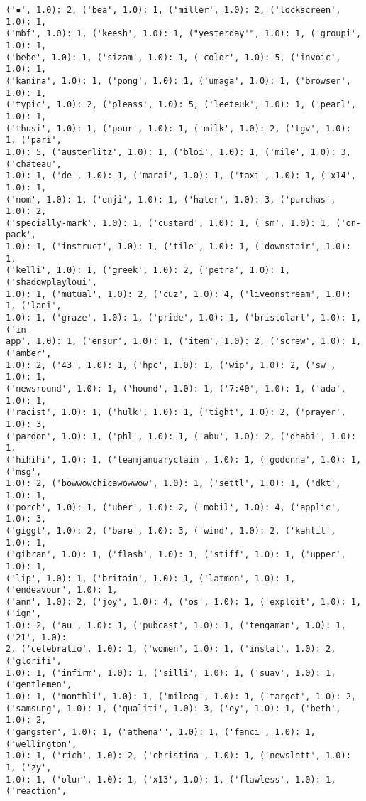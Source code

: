 \documentclass[11pt]{article}
\begin{document}
\begin{Verbatim}[commandchars=\\\{\}]
('▪', 1.0): 2, ('️bea', 1.0): 1, ('miller', 1.0): 2, ('lockscreen', 1.0): 1,
('mbf', 1.0): 1, ('keesh', 1.0): 1, ("yesterday'", 1.0): 1, ('groupi', 1.0): 1,
('bebe', 1.0): 1, ('sizam', 1.0): 1, ('color', 1.0): 5, ('invoic', 1.0): 1,
('kanina', 1.0): 1, ('pong', 1.0): 1, ('umaga', 1.0): 1, ('browser', 1.0): 1,
('typic', 1.0): 2, ('pleass', 1.0): 5, ('leeteuk', 1.0): 1, ('pearl', 1.0): 1,
('thusi', 1.0): 1, ('pour', 1.0): 1, ('milk', 1.0): 2, ('tgv', 1.0): 1, ('pari',
1.0): 5, ('austerlitz', 1.0): 1, ('bloi', 1.0): 1, ('mile', 1.0): 3, ('chateau',
1.0): 1, ('de', 1.0): 1, ('marai', 1.0): 1, ('taxi', 1.0): 1, ('x14', 1.0): 1,
('nom', 1.0): 1, ('enji', 1.0): 1, ('hater', 1.0): 3, ('purchas', 1.0): 2,
('specially-mark', 1.0): 1, ('custard', 1.0): 1, ('sm', 1.0): 1, ('on-pack',
1.0): 1, ('instruct', 1.0): 1, ('tile', 1.0): 1, ('downstair', 1.0): 1,
('kelli', 1.0): 1, ('greek', 1.0): 2, ('petra', 1.0): 1, ('shadowplayloui',
1.0): 1, ('mutual', 1.0): 2, ('cuz', 1.0): 4, ('liveonstream', 1.0): 1, ('lani',
1.0): 1, ('graze', 1.0): 1, ('pride', 1.0): 1, ('bristolart', 1.0): 1, ('in-
app', 1.0): 1, ('ensur', 1.0): 1, ('item', 1.0): 2, ('screw', 1.0): 1, ('amber',
1.0): 2, ('43', 1.0): 1, ('hpc', 1.0): 1, ('wip', 1.0): 2, ('sw', 1.0): 1,
('newsround', 1.0): 1, ('hound', 1.0): 1, ('7:40', 1.0): 1, ('ada', 1.0): 1,
('racist', 1.0): 1, ('hulk', 1.0): 1, ('tight', 1.0): 2, ('prayer', 1.0): 3,
('pardon', 1.0): 1, ('phl', 1.0): 1, ('abu', 1.0): 2, ('dhabi', 1.0): 1,
('hihihi', 1.0): 1, ('teamjanuaryclaim', 1.0): 1, ('godonna', 1.0): 1, ('msg',
1.0): 2, ('bowwowchicawowwow', 1.0): 1, ('settl', 1.0): 1, ('dkt', 1.0): 1,
('porch', 1.0): 1, ('uber', 1.0): 2, ('mobil', 1.0): 4, ('applic', 1.0): 3,
('giggl', 1.0): 2, ('bare', 1.0): 3, ('wind', 1.0): 2, ('kahlil', 1.0): 1,
('gibran', 1.0): 1, ('flash', 1.0): 1, ('stiff', 1.0): 1, ('upper', 1.0): 1,
('lip', 1.0): 1, ('britain', 1.0): 1, ('latmon', 1.0): 1, ('endeavour', 1.0): 1,
('ann', 1.0): 2, ('joy', 1.0): 4, ('os', 1.0): 1, ('exploit', 1.0): 1, ('ign',
1.0): 2, ('au', 1.0): 1, ('pubcast', 1.0): 1, ('tengaman', 1.0): 1, ('21', 1.0):
2, ('celebratio', 1.0): 1, ('women', 1.0): 1, ('instal', 1.0): 2, ('glorifi',
1.0): 1, ('infirm', 1.0): 1, ('silli', 1.0): 1, ('suav', 1.0): 1, ('gentlemen',
1.0): 1, ('monthli', 1.0): 1, ('mileag', 1.0): 1, ('target', 1.0): 2,
('samsung', 1.0): 1, ('qualiti', 1.0): 3, ('ey', 1.0): 1, ('beth', 1.0): 2,
('gangster', 1.0): 1, ("athena'", 1.0): 1, ('fanci', 1.0): 1, ('wellington',
1.0): 1, ('rich', 1.0): 2, ('christina', 1.0): 1, ('newslett', 1.0): 1, ('zy',
1.0): 1, ('olur', 1.0): 1, ('x13', 1.0): 1, ('flawless', 1.0): 1, ('reaction',

\end{Verbatim}
\end{document}
